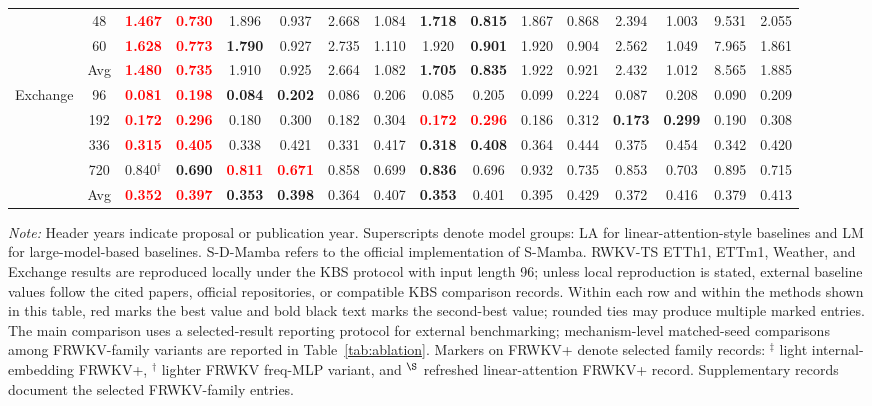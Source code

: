 \documentclass[a4paper,fleqn]{cas-sc}
\begin{document}
\begin{table}[t]
{\begin{tabular}{c|c|cc|cc|cc|cc|cc|cc|cc}
& 48 & \textbf{\textcolor{red}{1.467}} & \textbf{\textcolor{red}{0.730}} & 1.896 & 0.937 & 2.668 & 1.084 & \textbf{1.718} & \textbf{0.815} & 1.867 & 0.868 & 2.394 & 1.003 & 9.531 & 2.055 \\
& 60 & \textbf{\textcolor{red}{1.628}} & \textbf{\textcolor{red}{0.773}} & \textbf{1.790} & 0.927 & 2.735 & 1.110 & 1.920 & \textbf{0.901} & 1.920 & 0.904 & 2.562 & 1.049 & 7.965 & 1.861 \\
& Avg & \textbf{\textcolor{red}{1.480}} & \textbf{\textcolor{red}{0.735}} & 1.910 & 0.925 & 2.664 & 1.082 & \textbf{1.705} & \textbf{0.835} & 1.922 & 0.921 & 2.432 & 1.012 & 8.565 & 1.885 \\
\midrule
\multirow{5}{*}{Exchange}
& 96 & \textbf{\textcolor{red}{0.081}} & \textbf{\textcolor{red}{0.198}} & \textbf{0.084} & \textbf{0.202} & 0.086 & 0.206 & 0.085 & 0.205 & 0.099 & 0.224 & 0.087 & 0.208 & 0.090 & 0.209 \\
& 192 & \textbf{\textcolor{red}{0.172}} & \textbf{\textcolor{red}{0.296}} & 0.180 & 0.300 & 0.182 & 0.304 & \textbf{\textcolor{red}{0.172}} & \textbf{\textcolor{red}{0.296}} & 0.186 & 0.312 & \textbf{0.173} & \textbf{0.299} & 0.190 & 0.308 \\
& 336 & \textbf{\textcolor{red}{0.315}} & \textbf{\textcolor{red}{0.405}} & 0.338 & 0.421 & 0.331 & 0.417 & \textbf{0.318} & \textbf{0.408} & 0.364 & 0.444 & 0.375 & 0.454 & 0.342 & 0.420 \\
& 720 & 0.840$^\dagger$ & \textbf{0.690} & \textbf{\textcolor{red}{0.811}} & \textbf{\textcolor{red}{0.671}} & 0.858 & 0.699 & \textbf{0.836} & 0.696 & 0.932 & 0.735 & 0.853 & 0.703 & 0.895 & 0.715 \\
& Avg & \textbf{\textcolor{red}{0.352}} & \textbf{\textcolor{red}{0.397}} & \textbf{0.353} & \textbf{0.398} & 0.364 & 0.407 & \textbf{0.353} & 0.401 & 0.395 & 0.429 & 0.372 & 0.416 & 0.379 & 0.413 \\
\bottomrule
\end{tabular}}
\par\smallskip
\begin{minipage}{\textwidth}
\footnotesize \emph{Note:} Header years indicate proposal or publication year. Superscripts denote model groups: LA for linear-attention-style baselines and LM for large-model-based baselines. S-D-Mamba refers to the official implementation of S-Mamba. RWKV-TS ETTh1, ETTm1, Weather, and Exchange results are reproduced locally under the KBS protocol with input length 96; unless local reproduction is stated, external baseline values follow the cited papers, official repositories, or compatible KBS comparison records. Within each row and within the methods shown in this table, red marks the best value and bold black text marks the second-best value; rounded ties may produce multiple marked entries. The main comparison uses a selected-result reporting protocol for external benchmarking; mechanism-level matched-seed comparisons among FRWKV-family variants are reported in Table~\ref{tab:ablation}. Markers on FRWKV+ denote selected family records: $^\ddagger$ light internal-embedding FRWKV+, $^\dagger$ lighter FRWKV freq-MLP variant, and $^\S$ refreshed linear-attention FRWKV+ record. Supplementary records document the selected FRWKV-family entries.

\end{minipage}
\end{table}
\end{document}
